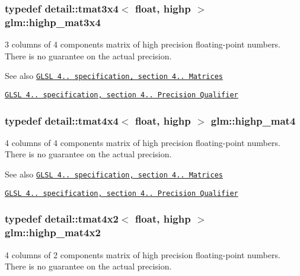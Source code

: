 \subsubsection[{\texorpdfstring{highp\+\_\+mat3x4}{highp_mat3x4}}]{\setlength{\rightskip}{0pt plus 5cm}typedef detail\+::tmat3x4$<$ float, highp $>$ {\bf glm\+::highp\+\_\+mat3x4}}\hypertarget{group__core__precision_gabaf9c8dd35db715b1093042703f879d0}{}\label{group__core__precision_gabaf9c8dd35db715b1093042703f879d0}
3 columns of 4 components matrix of high precision floating-\/point numbers. There is no guarantee on the actual precision.

\begin{DoxySeeAlso}{See also}
\href{http://www.opengl.org/registry/doc/GLSLangSpec.4.20.8.pdf}{\tt G\+L\+SL 4.. specification, section 4.. Matrices} 

\href{http://www.opengl.org/registry/doc/GLSLangSpec.4.20.8.pdf}{\tt G\+L\+SL 4.. specification, section 4.. Precision Qualifier} 
\end{DoxySeeAlso}
\subsubsection[{\texorpdfstring{highp\+\_\+mat4}{highp_mat4}}]{\setlength{\rightskip}{0pt plus 5cm}typedef detail\+::tmat4x4$<$ float, highp $>$ {\bf glm\+::highp\+\_\+mat4}}\hypertarget{group__core__precision_ga3067b3b8ce793227a51b2e3c233257d5}{}\label{group__core__precision_ga3067b3b8ce793227a51b2e3c233257d5}
4 columns of 4 components matrix of high precision floating-\/point numbers. There is no guarantee on the actual precision.

\begin{DoxySeeAlso}{See also}
\href{http://www.opengl.org/registry/doc/GLSLangSpec.4.20.8.pdf}{\tt G\+L\+SL 4.. specification, section 4.. Matrices} 

\href{http://www.opengl.org/registry/doc/GLSLangSpec.4.20.8.pdf}{\tt G\+L\+SL 4.. specification, section 4.. Precision Qualifier} 
\end{DoxySeeAlso}
\subsubsection[{\texorpdfstring{highp\+\_\+mat4x2}{highp_mat4x2}}]{\setlength{\rightskip}{0pt plus 5cm}typedef detail\+::tmat4x2$<$ float, highp $>$ {\bf glm\+::highp\+\_\+mat4x2}}\hypertarget{group__core__precision_gadf9c4a7947c2b0a79f52cc86a860f270}{}\label{group__core__precision_gadf9c4a7947c2b0a79f52cc86a860f270}
4 columns of 2 components matrix of high precision floating-\/point numbers. There is no guarantee on the actual precision.

